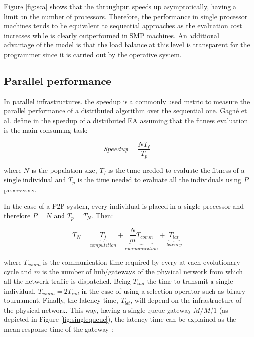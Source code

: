 Figure \ref{fig:sca} shows that the throughput speeds up asymptotically, having a limit on the number of processors. Therefore, the performance in single processor machines tends to be equivalent to sequential approaches as the evaluation cost increases while is clearly outperformed in SMP machines. An additional advantage of the \evag model is that the load balance at this level is transparent for the programmer since it is carried out by the operative system.

\clearpage
\subsection{Parallel performance}
\label{sec:parallelperformance}

In parallel infrastructures, the speedup is a commonly used metric to measure the parallel performance of a distributed algorithm over the sequential one. Gagn\'e et al. define in \cite{gagne:msperformance} the speedup of a distributed EA assuming that the fitness evaluation is the main consuming task:

\begin{equation}
Speedup = \frac{NT_f}{T_p}
\end{equation}

\noindent where $N$ is the population size, $T_f$ is the time needed to evaluate the fitness of a single individual and $T_p$ is the time needed to evaluate all the individuals using $P$ processors. 

In the case of a P2P system, every individual is placed in a single processor and therefore $P=N$ and $T_p= T_N$. Then:

\begin{equation}
T_{N} = \underbrace{T_f}_{computation} + \underbrace{\frac{N}{m}T_{comm}}_{communication} + \underbrace{T_{lat}}_{latency}
\end{equation}

\noindent where $T_{comm}$ is the communication time required by every \evag at each evolutionary cycle and $m$ is the number of hub/gateways of the physical network from which all the network traffic is dispatched. Being $T_{ind}$ the time to transmit a single individual, $T_{comm} = 2T_{ind}$ in the case of using a selection operator such as binary tournament. Finally, the latency time, $T_{lat}$, will depend on the infrastructure of the physical network. This way, having a single queue gateway $M/M/1$ (as depicted in Figure \ref{fig:singlequeue}), the latency time can be explained as the mean response time of the gateway \cite{jain:performanceanalysis}:

